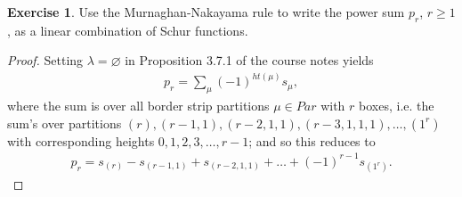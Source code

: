 \documentclass[12pt]{extarticle}
\newcommand{\<}{\langle}
\renewcommand{\>}{\rangle}
\renewcommand{\emptyset}{\varnothing}
\theoremstyle{definition}
\newtheorem{exercise}{Exercise}
\begin{document}
\begin{exercise}
  Use the Murnaghan-Nakayama rule to write the power sum $p_r$, $r \geq 1$, as a linear combination of Schur functions.
\end{exercise}
\begin{proof}
  Setting $\lambda= \emptyset$ in Proposition 3.7.1 of the course notes yields
  \begin{align*}
    p_r  = \sum\limits_{\mu}(-1)^{ht(\mu)} s_\mu,
  \end{align*}
  where the sum is over all border strip partitions $\mu \in Par$ with $r$ boxes, i.e. the sum's over  partitions $(r), (r-1,1), (r-2,1,1), (r-3,1,1,1), \dots, (1^r)$ with corresponding heights
  $0,1,2,3, \dots, r-1$; and so this reduces to
  \begin{align*}
    p_r =  s_{(r)} - s_{(r-1,1)} + s_{(r-2,1,1)} + \dots + (-1)^{r-1} s_{(1^r)}.
  \end{align*}
\end{proof}
\end{document}
